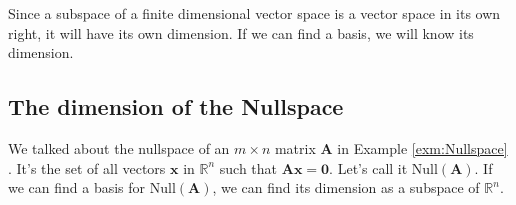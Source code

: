 \documentclass[
]{book}
\theoremstyle{definition}
\theoremstyle{definition}
\theoremstyle{definition}
\theoremstyle{definition}
\theoremstyle{remark}
\begin{document}
Since a subspace of a finite dimensional vector space is a vector space in its own right, it will have its own dimension. If we can find a basis, we will know its dimension.

\subsection*{The dimension of the Nullspace}\label{the-dimension-of-the-nullspace}

We talked about the nullspace of an \(m\times n\) matrix \(\mathbf{A}\) in Example \ref{exm:Nullspace} . It's the set of all vectors \(\mathbf{x}\) in \(\mathbb{R}^n\) such that \(\mathbf{A}\mathbf{x}=\mathbf{0}.\) Let's call it \(\text{Null}(\mathbf{A})\). If we can find a basis for \(\text{Null}(\mathbf{A})\), we can find its dimension as a subspace of \(\mathbb{R}^n\).
\end{document}
